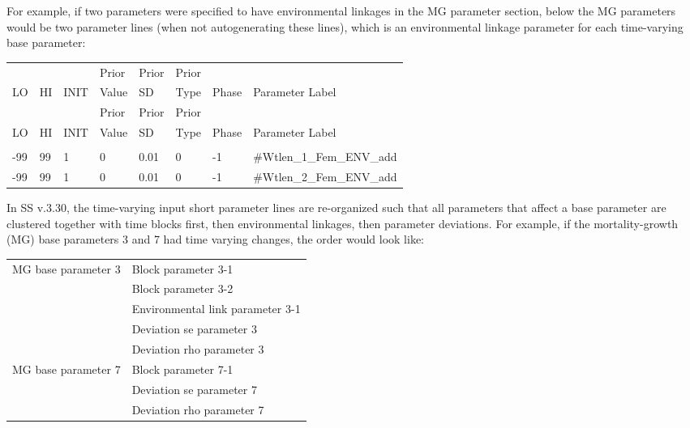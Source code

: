 For example, if two parameters were specified to have environmental linkages in the MG parameter section, below the MG parameters would be two parameter lines (when not autogenerating these lines), which is an environmental linkage parameter for each time-varying base parameter:
\begin{longtable}{ p{0.7cm} p{0.7cm} p{0.7cm}  p{1cm}  p{1.4cm}  p{1cm} p{1cm} p{6.7cm}  }
	\hline
	   &    &      & Prior &  Prior & Prior & & \Tstrut\\
	LO & HI & INIT & Value &  SD    & Type  & Phase & Parameter Label \Bstrut\\
	\hline
	\endfirsthead
	
	\hline
	   &    &      & Prior &  Prior & Prior &  & \Tstrut\\
	LO & HI & INIT & Value &  SD    & Type  & Phase & Parameter Label \Bstrut\\
	\hline
	\endhead
	
	\endfoot
	
	\endlastfoot
	
	\multicolumn{7}{l}{COND: Only if MG parameters are time-varying} \Tstrut\\
	-99   & 99  & 1 & 0 & 0.01 & 0 & -1 &\#Wtlen\_1\_Fem\_ENV\_add\Tstrut\\
	-99   & 99  & 1 & 0 & 0.01 & 0 & -1 &\#Wtlen\_2\_Fem\_ENV\_add\Bstrut\\
	\hline
\end{longtable}

 In SS v.3.30, the time-varying input short parameter lines are re-organized such that all parameters that affect a base parameter are clustered together with time blocks first, then environmental linkages, then parameter deviations. For example, if the mortality-growth (MG) base parameters 3 and 7 had time varying changes, the order would look like:

\begin{center}
	\begin{longtable}{p{5cm} p{10cm}}
		\hline
		MG base parameter 3 & Block parameter 3-1\Tstrut\\
		& Block parameter 3-2\\
		& Environmental link parameter 3-1\\
		& Deviation se parameter 3 \\
		& Deviation rho parameter 3 \Bstrut\\
		MG base parameter 7 & Block parameter 7-1 \\
		& Deviation se parameter 7 \\
		& Deviation rho parameter 7 \Bstrut\\
		\hline	 	                    
		
	\end{longtable}
\end{center}

